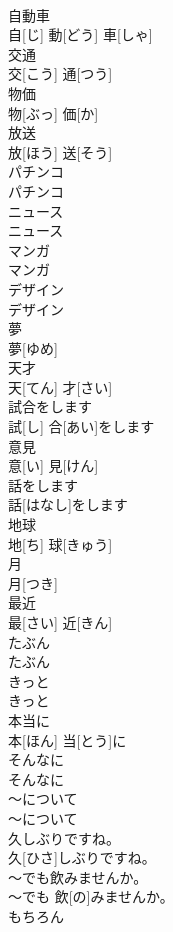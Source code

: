 \documentclass[8pt]{extreport}
\begin{document}
\begin{CJK}{UTF8}{min}
\\	自動車	
\\	自[じ] 動[どう] 車[しゃ]		
\\	交通	
\\	交[こう] 通[つう]		
\\	物価	
\\	物[ぶっ] 価[か]		
\\	放送	
\\	放[ほう] 送[そう]		
\\	パチンコ	
\\	パチンコ		
\\	ニュース	
\\	ニュース		
\\	マンガ	
\\	マンガ		
\\	デザイン	
\\	デザイン		
\\	夢	
\\	夢[ゆめ]		
\\	天才	
\\	天[てん] 才[さい]		
\\	試合をします	
\\	試[し] 合[あい]をします		
\\	意見	
\\	意[い] 見[けん]		
\\	話をします	
\\	話[はなし]をします		
\\	地球	
\\	地[ち] 球[きゅう]		
\\	月	
\\	月[つき]		
\\	最近	
\\	最[さい] 近[きん]		
\\	たぶん	
\\	たぶん		
\\	きっと	
\\	きっと		
\\	本当に	
\\	本[ほん] 当[とう]に		
\\	そんなに	
\\	そんなに		
\\	～について	
\\	～について		
\\	久しぶりですね。	
\\	久[ひさ]しぶりですね。		
\\	～でも飲みませんか。	
\\	～でも 飲[の]みませんか。		
\\	もちろん	

\end{CJK}
\end{document}
